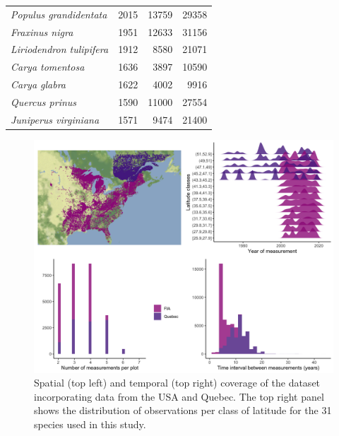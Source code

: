 {\begin{longtable}{lrrr}
    \emph{Populus grandidentata} & 2015 & 13759 & 29358 \\
    \emph{Fraxinus nigra} & 1951 & 12633 & 31156 \\
    \emph{Liriodendron tulipifera} & 1912 & 8580 & 21071 \\
    \emph{Carya tomentosa} & 1636 & 3897 & 10590 \\
    \emph{Carya glabra} & 1622 & 4002 & 9916 \\
    \emph{Quercus prinus} & 1590 & 11000 & 27554 \\
    \emph{Juniperus virginiana} & 1571 & 9474 & 21400 \\
  \bottomrule
\end{longtable}
}

\newpage

\hypertarget{fig:figsupp1_ch2}{%
\begin{figure}
\centering
\includegraphics{manuscript/figs/fig-plotCoverage-1.png}
\caption[{Spatial (top left) and temporal (top right) coverage of the
dataset incorporating data from the USA and Quebec.}]{Spatial (top left)
and temporal (top right) coverage of the dataset incorporating data from
the USA and Quebec. The top right panel shows the distribution of
observations per class of latitude for the 31 species used in this
study.}
\label{fig:figsupp1_ch2}
\end{figure}
}

\newpage


